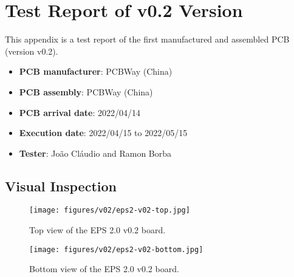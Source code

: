 %
%
%
%
%

%
%
%
%
%
%

\chapter{Test Report of v0.2 Version} \label{anx:test-report-v02}

This appendix is a test report of the first manufactured and assembled PCB (version v0.2).

\begin{itemize}
    \item \textbf{PCB manufacturer}: PCBWay (China)
    \item \textbf{PCB assembly}: PCBWay (China)
    \item \textbf{PCB arrival date}: 2022/04/14 
    \item \textbf{Execution date}: 2022/04/15 to 2022/05/15
    \item \textbf{Tester}: João Cláudio and Ramon Borba
\end{itemize}

\section{Visual Inspection}

\begin{figure}[!ht]
    \begin{center}
        \texttt{[image: figures/v02/eps2-v02-top.jpg]}
        \caption{Top view of the EPS 2.0 v0.2 board.}
        \label{fig:eps2-v01-top}
    \end{center}
\end{figure}

\begin{figure}[!ht]
    \begin{center}
        \texttt{[image: figures/v02/eps2-v02-bottom.jpg]}
        \caption{Bottom view of the EPS 2.0 v0.2 board.}
        \label{fig:eps2-v01-bottom}
    \end{center}
\end{figure}

